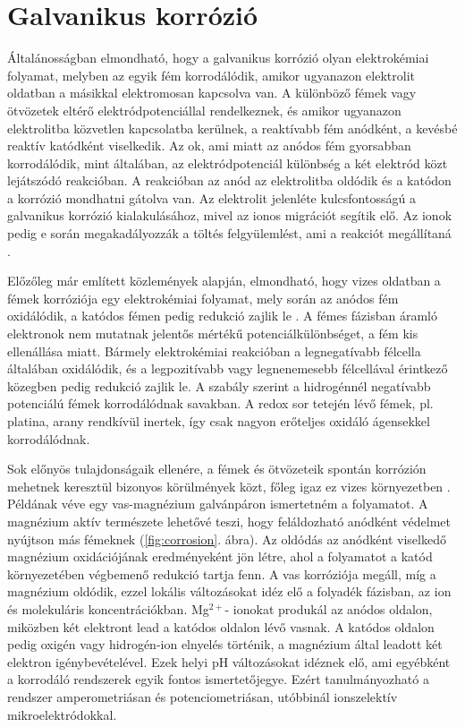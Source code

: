 \section{Galvanikus korrózió}

Általánosságban elmondható, hogy a galvanikus korrózió olyan elektrokémiai folyamat, melyben az egyik fém korrodálódik, amikor ugyanazon elektrolit oldatban a másikkal elektromosan kapcsolva van. A különböző fémek vagy ötvözetek eltérő elektródpotenciállal rendelkeznek, és amikor ugyanazon elektrolitba közvetlen kapcsolatba kerülnek, a reaktívabb fém anódként, a kevésbé reaktív katódként viselkedik. Az ok, ami miatt az anódos fém gyorsabban korrodálódik, mint általában, az elektródpotenciál különbség a két elektród közt lejátszódó reakcióban. A reakcióban az anód az elektrolitba oldódik és a katódon a korrózió mondhatni gátolva van. Az elektrolit jelenléte kulcsfontosságú a galvanikus korrózió kialakulásához, mivel az ionos migrációt segítik elő. Az ionok pedig e során megakadályozzák a töltés felgyülemlést, ami a reakciót megállítaná \cite{fontana2018corrosion}. 

Előzőleg már említett közlemények alapján, elmondható, hogy vizes oldatban a fémek korróziója egy elektrokémiai folyamat, mely során az anódos fém oxidálódik, a katódos fémen pedig redukció zajlik le \cite{isaacs1981scanning}. A fémes fázisban áramló elektronok nem mutatnak jelentős mértékű potenciálkülönbséget, a fém kis ellenállása miatt. Bármely elektrokémiai reakcióban a legnegatívabb félcella általában oxidálódik, és a legpozitívabb vagy legnenemesebb félcellával érintkező közegben pedig redukció zajlik le. A szabály szerint a hidrogénnél negatívabb potenciálú fémek korrodálódnak savakban. A redox sor tetején lévő fémek, pl. platina, arany rendkívül inertek, így csak nagyon erőteljes oxidáló ágensekkel korrodálódnak. 

Sok előnyös tulajdonságaik ellenére, a fémek és ötvözeteik spontán korrózión mehetnek keresztül bizonyos körülmények közt, főleg igaz ez vizes környezetben \cite{izquierdo2013potentiometric}. Példának véve egy vas-magnézium galvánpáron ismertetném a folyamatot. A magnézium aktív természete lehetővé teszi, hogy feláldozható anódként védelmet nyújtson más fémeknek (\ref{fig:corrosion}. ábra). Az oldódás az anódként viselkedő magnézium oxidációjának eredményeként jön létre, ahol a folyamatot a katód környezetében végbemenő redukció tartja fenn. A vas korróziója megáll, míg a magnézium oldódik, ezzel lokális változásokat idéz elő a folyadék fázisban, az ion és molekuláris koncentrációkban. Mg$^{2+}$- ionokat produkál az anódos oldalon, miközben két elektront lead a katódos oldalon lévő vasnak. A katódos oldalon pedig oxigén vagy hidrogén-ion elnyelés történik, a magnézium által leadott két elektron igénybevételével. Ezek helyi pH változásokat idéznek elő, ami egyébként a korrodáló rendszerek egyik fontos ismertetőjegye. Ezért tanulmányozható a rendszer amperometriásan és potenciometriásan, utóbbinál ionszelektív mikroelektródokkal.

